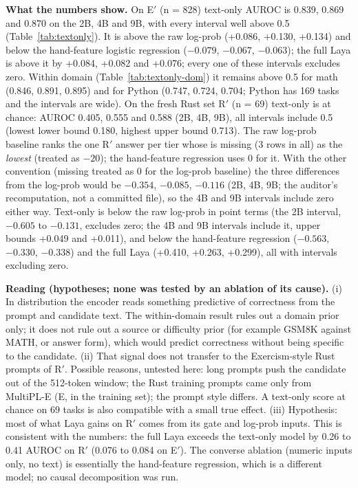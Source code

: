 \documentclass[11pt,a4paper]{article}
\newcommand{\code}[1]{\texttt{\detokenize{#1}}}
\begin{document}


\textbf{What the numbers show.} On E$'$ (n = 828) text-only AUROC is 0.839, 0.869 and 0.870 on the 2B, 4B and 9B, with every interval well above 0.5 (Table~\ref{tab:textonly}). It is above the raw log-prob (+0.086, +0.130, +0.134) and below the hand-feature logistic regression ($-0.079$, $-0.067$, $-0.063$); the full Laya is above it by +0.084, +0.082 and +0.076; every one of these intervals excludes zero. Within domain (Table~\ref{tab:textonly-dom}) it remains above 0.5 for math (0.846, 0.891, 0.895) and for Python (0.747, 0.724, 0.704; Python has 169 tasks and the intervals are wide). On the fresh Rust set R$'$ (n = 69) text-only is at chance: AUROC 0.405, 0.555 and 0.588 (2B, 4B, 9B), all intervals include 0.5 (lowest lower bound 0.180, highest upper bound 0.713). The raw log-prob baseline ranks the one R$'$ answer per tier whose \code{mean_logprob} is missing (3 rows in all) as the \emph{lowest} (treated as $-20$); the hand-feature regression uses 0 for it. With the other convention (missing treated as 0 for the log-prob baseline) the three differences from the log-prob would be $-0.354$, $-0.085$, $-0.116$ (2B, 4B, 9B; the auditor's recomputation, not a committed file), so the 4B and 9B intervals include zero either way. Text-only is below the raw log-prob in point terms (the 2B interval, $-0.605$ to $-0.131$, excludes zero; the 4B and 9B intervals include it, upper bounds +0.049 and +0.011), and below the hand-feature regression ($-0.563$, $-0.330$, $-0.338$) and the full Laya (+0.410, +0.263, +0.299), all with intervals excluding zero.

\textbf{Reading (hypotheses; none was tested by an ablation of its cause).}
(i) In distribution the encoder reads something predictive of correctness from the prompt and candidate text. The within-domain result rules out a domain prior only; it does not rule out a source or difficulty prior (for example GSM8K against MATH, or answer form), which would predict correctness without being specific to the candidate.
(ii) That signal does not transfer to the Exercism-style Rust prompts of R$'$. Possible reasons, untested here: long prompts push the candidate out of the 512-token window; the Rust training prompts came only from MultiPL-E (E, in the training set); the prompt style differs. A text-only score at chance on 69 tasks is also compatible with a small true effect.
(iii) Hypothesis: most of what Laya gains on R$'$ comes from its gate and log-prob inputs. This is consistent with the numbers: the full Laya exceeds the text-only model by 0.26 to 0.41 AUROC on R$'$ (0.076 to 0.084 on E$'$). The converse ablation (numeric inputs only, no text) is essentially the hand-feature regression, which is a different model; no causal decomposition was run.
\end{document}
